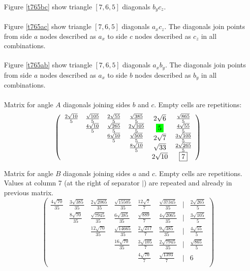 \documentclass[11pt]{article}
\begin{document}
Figure \ref{t765bc} show triangle $[7,6,5]$ diagonals $b_yc_z$.
\\\\
Figure \ref{t765ac} show triangle $[7,6,5]$ diagonals $a_xc_z$.
The diagonals join points from side $a$ nodes described as $a_x$ to side $c$ nodes described as $c_z$ in all combinations.
\\\\
Figure \ref{t765ab} show triangle $[7,6,5]$ diagonals $a_xb_y$.
The diagonals join points from side $a$ nodes described as $a_x$ to side $b$ nodes described as $b_y$ in all combinations.
\\\\
\newcommand\five{\colorbox{green}{$5$}}
Matrix for angle $A$ diagonals joining sides $b$ and $c$. Empty cells are repetitions:
\begin{equation}\label{eq:appendrow}
\left(\begin{array}{cccccc}
	\frac{2\sqrt{10}}{5} & \frac{\sqrt{105}}{5} & \frac{2\sqrt{55}}{5} & \frac{\sqrt{385}}{5} & 2\sqrt{6} & \frac{\sqrt{865}}{5} \\
	& \frac{4\sqrt{10}}{5} & \frac{\sqrt{265}}{5} & \frac{2\sqrt{105}}{5} & \five & \frac{4\sqrt{55}}{5} \\
	& & \frac{6\sqrt{10}}{5} & \frac{\sqrt{505}}{5} & 2\sqrt{7} & \frac{3\sqrt{105}}{5}\\
	& & & \frac{8\sqrt{10}}{5} & \sqrt{33} & \frac{2\sqrt{265}}{5}\\
	& & & & 2\sqrt{10} & \boxed{7} \\
\end{array}\right)
\end{equation}


Matrix for angle $B$ diagonals joining sides $a$ and $c$. Empty cells are repetitions.
Values at column 7 (at the right of separator $|$) are repeated and already in previous matrix.
\begin{equation}\label{eq:appendrow}
\left(\begin{array}{cccccccc}
	\frac{4\sqrt{70}}{35} & \frac{3\sqrt{385}}{35} & \frac{2\sqrt{2065}}{35} & \frac{\sqrt{15505}}{35} & \frac{12\sqrt{7}}{7} & \frac{\sqrt{37345}}{35} & | & \frac{2\sqrt{265}}{5}\\
	& \frac{8\sqrt{70}}{35} & \frac{\sqrt{7945}}{35} & \frac{6\sqrt{385}}{35} & \frac{\sqrt{889}}{7} & \frac{4\sqrt{2065}}{35} & | & \frac{3\sqrt{105}}{5} \\
	& & \frac{12\sqrt{70}}{35} & \frac{\sqrt{14665}}{35} & \frac{2\sqrt{217}}{7} & \frac{9\sqrt{385}}{35} & | & \frac{4\sqrt{55}}{5}\\
	& & & \frac{16\sqrt{70}}{35} & \frac{3\sqrt{105}}{7} & \frac{2\sqrt{7945}}{35} & | & \frac{\sqrt{865}}{5}\\
	& & & & \frac{4\sqrt{70}}{7} & \frac{\sqrt{1393}}{7} & | & \boxed{6}\\
\end{array}\right)
\end{equation}
\end{document}
